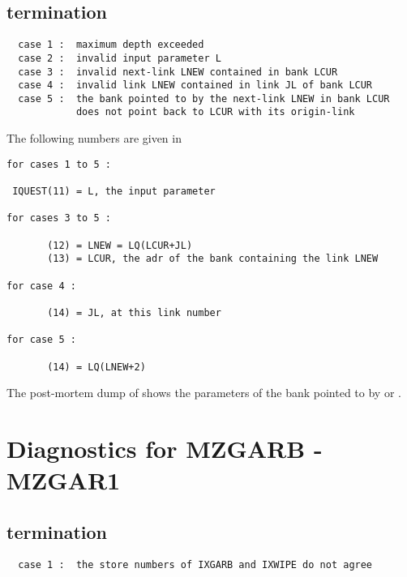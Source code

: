 
\subsection*{ termination}

\begin{verbatim}
  case 1 :  maximum depth exceeded
  case 2 :  invalid input parameter L
  case 3 :  invalid next-link LNEW contained in bank LCUR
  case 4 :  invalid link LNEW contained in link JL of bank LCUR
  case 5 :  the bank pointed to by the next-link LNEW in bank LCUR
            does not point back to LCUR with its origin-link
\end{verbatim}

The following numbers are given in 

\begin{verbatim}
for cases 1 to 5 :

 IQUEST(11) = L, the input parameter

for cases 3 to 5 :

       (12) = LNEW = LQ(LCUR+JL)
       (13) = LCUR, the adr of the bank containing the link LNEW

for case 4 :

       (14) = JL, at this link number

for case 5 :

       (14) = LQ(LNEW+2)
\end{verbatim}

The post-mortem dump of  
shows the parameters of the bank
pointed to by  or .

\section{Diagnostics for MZGARB - MZGAR1}


\subsection*{ termination}

\begin{verbatim}
  case 1 :  the store numbers of IXGARB and IXWIPE do not agree
\end{verbatim}

